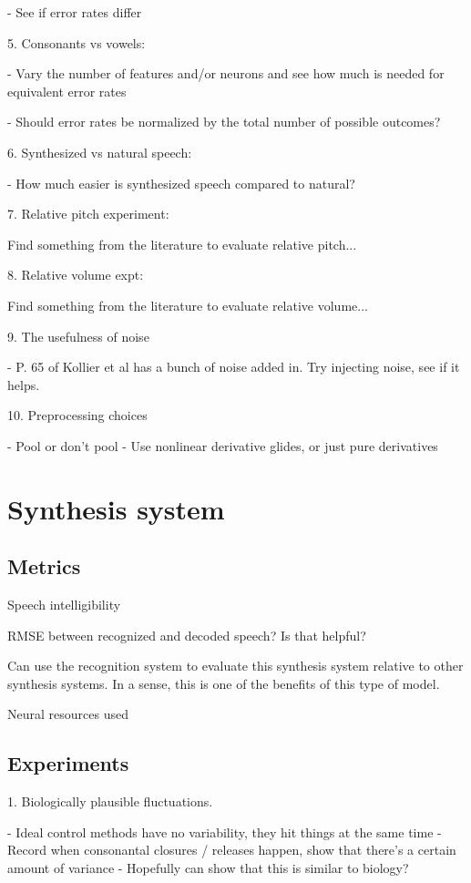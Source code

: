 - See if error rates differ

5. Consonants vs vowels:

- Vary the number of features and/or neurons and see
  how much is needed for equivalent error rates

  - Should error rates be normalized by the total number
    of possible outcomes?

6. Synthesized vs natural speech:

- How much easier is synthesized speech compared to natural?

7. Relative pitch experiment:

Find something from the literature to evaluate relative pitch...

8. Relative volume expt:

Find something from the literature to evaluate relative volume...

9. The usefulness of noise

- P. 65 of Kollier et al has a bunch of noise added in.
  Try injecting noise, see if it helps.

10. Preprocessing choices

- Pool or don't pool
- Use nonlinear derivative glides, or just pure derivatives

\section{Synthesis system}

\subsection{Metrics}

Speech intelligibility

RMSE between recognized and decoded speech?
Is that helpful?

Can use the recognition system to evaluate
this synthesis system relative to other
synthesis systems.
In a sense, this is one of the benefits
of this type of model.

Neural resources used

\subsection{Experiments}

1. Biologically plausible fluctuations.

- Ideal control methods have no variability, they hit things at the same time
- Record when consonantal closures / releases happen, show that there's
  a certain amount of variance
- Hopefully can show that this is similar to biology?

